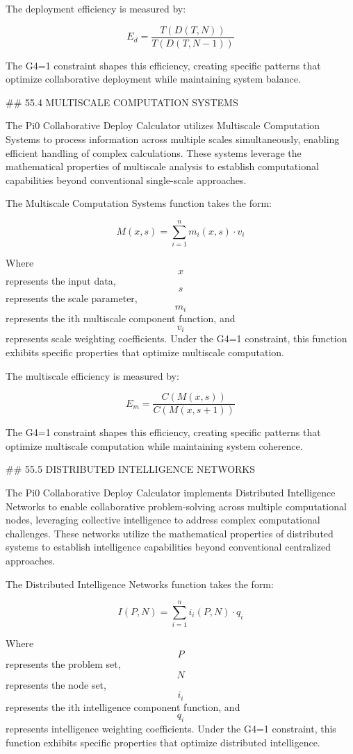 The deployment efficiency is measured by:

$$ E_d = \frac{T(D(T, N))}{T(D(T, N-1))} $$

The G4=1 constraint shapes this efficiency, creating specific patterns that optimize collaborative deployment while maintaining system balance.

## 55.4 MULTISCALE COMPUTATION SYSTEMS

The Pi0 Collaborative Deploy Calculator utilizes Multiscale Computation Systems to process information across multiple scales simultaneously, enabling efficient handling of complex calculations. These systems leverage the mathematical properties of multiscale analysis to establish computational capabilities beyond conventional single-scale approaches.

The Multiscale Computation Systems function takes the form:

$$ M(x, s) = \sum_{i=1}^{n} m_i(x, s) \cdot v_i $$

Where $$ x $$ represents the input data, $$ s $$ represents the scale parameter, $$ m_i $$ represents the ith multiscale component function, and $$ v_i $$ represents scale weighting coefficients. Under the G4=1 constraint, this function exhibits specific properties that optimize multiscale computation.

The multiscale efficiency is measured by:

$$ E_m = \frac{C(M(x, s))}{C(M(x, s+1))} $$

The G4=1 constraint shapes this efficiency, creating specific patterns that optimize multiscale computation while maintaining system coherence.

## 55.5 DISTRIBUTED INTELLIGENCE NETWORKS

The Pi0 Collaborative Deploy Calculator implements Distributed Intelligence Networks to enable collaborative problem-solving across multiple computational nodes, leveraging collective intelligence to address complex computational challenges. These networks utilize the mathematical properties of distributed systems to establish intelligence capabilities beyond conventional centralized approaches.

The Distributed Intelligence Networks function takes the form:

$$ I(P, N) = \sum_{i=1}^{n} i_i(P, N) \cdot q_i $$

Where $$ P $$ represents the problem set, $$ N $$ represents the node set, $$ i_i $$ represents the ith intelligence component function, and $$ q_i $$ represents intelligence weighting coefficients. Under the G4=1 constraint, this function exhibits specific properties that optimize distributed intelligence.

